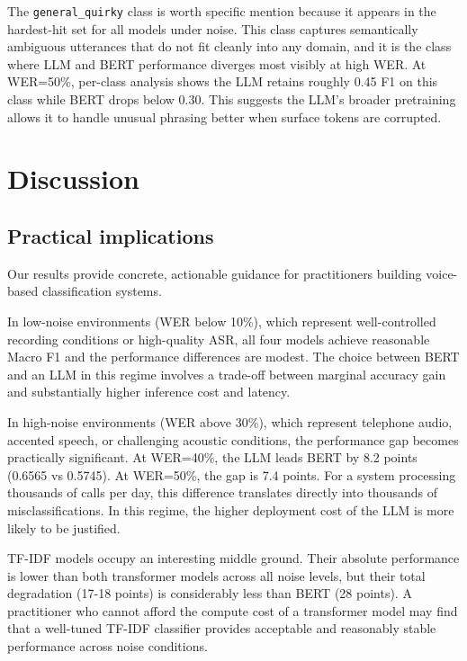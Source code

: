 \documentclass[11pt,a4paper]{article}
\begin{document}
The \texttt{general\_quirky} class is worth specific mention because it appears in the hardest-hit set for all models under noise. This class captures semantically ambiguous utterances that do not fit cleanly into any domain, and it is the class where LLM and BERT performance diverges most visibly at high WER. At WER=50\%, per-class analysis shows the LLM retains roughly 0.45 F1 on this class while BERT drops below 0.30. This suggests the LLM's broader pretraining allows it to handle unusual phrasing better when surface tokens are corrupted.

\section{Discussion}

\subsection{Practical implications}

Our results provide concrete, actionable guidance for practitioners building voice-based classification systems.

In low-noise environments (WER below 10\%), which represent well-controlled recording conditions or high-quality ASR, all four models achieve reasonable Macro F1 and the performance differences are modest. The choice between BERT and an LLM in this regime involves a trade-off between marginal accuracy gain and substantially higher inference cost and latency.

In high-noise environments (WER above 30\%), which represent telephone audio, accented speech, or challenging acoustic conditions, the performance gap becomes practically significant. At WER=40\%, the LLM leads BERT by 8.2 points (0.6565 vs 0.5745). At WER=50\%, the gap is 7.4 points. For a system processing thousands of calls per day, this difference translates directly into thousands of misclassifications. In this regime, the higher deployment cost of the LLM is more likely to be justified.

TF-IDF models occupy an interesting middle ground. Their absolute performance is lower than both transformer models across all noise levels, but their total degradation (17-18 points) is considerably less than BERT (28 points). A practitioner who cannot afford the compute cost of a transformer model may find that a well-tuned TF-IDF classifier provides acceptable and reasonably stable performance across noise conditions.
\end{document}

